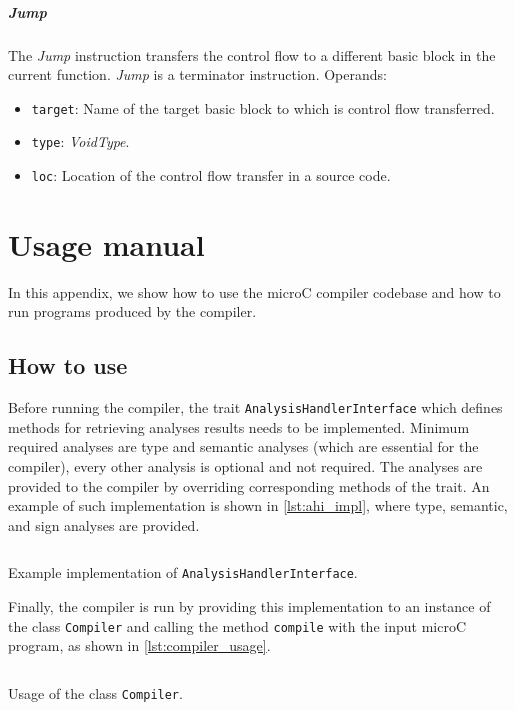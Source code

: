 \documentclass[thesis=M,english]{FITthesis}[2019/12/23]
\begin{document}
\paragraph*{Jump} The \emph{Jump} instruction transfers the control flow to a different basic block in the current function. \emph{Jump} is a terminator instruction. Operands:
\begin{itemize}
    \item \texttt{target}: Name of the target basic block to which is control flow transferred.
    \item \texttt{type}: \emph{VoidType}.
    \item \texttt{loc}: Location of the control flow transfer in a source code.
\end{itemize}



\chapter{Usage manual}\label{chap:manual}
In this appendix, we show how to use the microC compiler codebase and how to run programs produced by the compiler.

\section{How to use}\label{sec:how_to_use}
Before running the compiler, the trait \texttt{AnalysisHandlerInterface} which defines methods for retrieving analyses results needs to be implemented. Minimum required analyses are type and semantic analyses (which are essential for the compiler), every other analysis is optional and not required. The analyses are provided to the compiler by overriding corresponding methods of the trait. An example of such implementation is shown in \autoref{lst:ahi_impl}, where type, semantic, and sign analyses are provided.

\begin{listing}[H]
    \footnotesize
	\inputminted[tabsize=2,breaklines,bgcolor=codebg]{scala}{snippets/ahi_impl.m}
	\caption{Example implementation of \texttt{AnalysisHandlerInterface}.}
	\label{lst:ahi_impl}
\end{listing}

Finally, the compiler is run by providing this implementation to an instance of the class \texttt{Compiler} and calling the method \texttt{compile} with the input microC program, as shown in \autoref{lst:compiler_usage}.

\begin{listing}[H]
	\inputminted[tabsize=2,breaklines,bgcolor=codebg]{scala}{snippets/compiler_usage.m}
	\caption{Usage of the class \texttt{Compiler}.}
	\label{lst:compiler_usage}
\end{listing}
\end{document}
